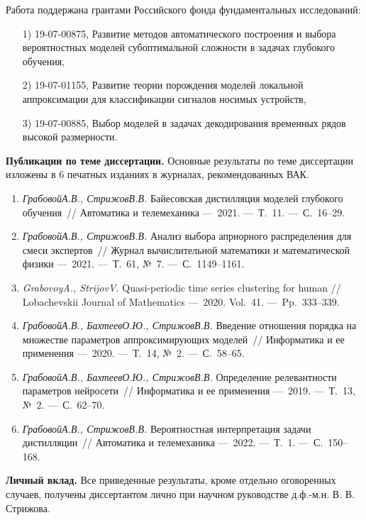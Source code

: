 \documentclass{dissert}
\begin{document}
Работа поддержана грантами Российского фонда фундаментальных исследований:

\begin{enumerate}
    \item[1)] 19-07-00875, Развитие методов автоматического построения и выбора вероятностных моделей субоптимальной сложности в задачах глубокого обучения,
    \item[2)] 19-07-01155, Развитие теории порождения моделей локальной аппроксимации для классификации сигналов носимых устройств,
    \item[3)] 19-07-00885, Выбор моделей в задачах декодирования временных рядов высокой размерности.
\end{enumerate}

\vspace{0.5cm}
\textbf{Публикации по теме диссертации.} Основные результаты по теме диссертации изложены в 6 печатных изданиях в журналах, рекомендованных ВАК.
\begin{enumerate}
    \item \textit{Грабовой\;А.В., Стрижов\;В.В.} Байесовская дистилляция моделей глубокого обучения~// Автоматика и телемеханика ---~2021. ---~Т.~11. ---~С.~16--29.
    \item \textit{Грабовой\;А.В., Стрижов\;В.В.} Анализ выбора априорного распределения для смеси экспертов~// Журнал вычислительной математики и математической физики ---~2021. ---~Т.~61, №~7. ---~С.~1149--1161.
    \item \textit{Grabovoy\;A., Strijov\;V.} Quasi-periodic time series clustering for human // Lobachevskii Journal of Mathematics ---~2020. Vol.~41. ---~Pp.~333--339.
    \item \textit{Грабовой\;А.В., Бахтеев\;О.Ю., Стрижов\;В.В.} Введение отношения порядка на множестве параметров аппроксимирующих моделей~// Информатика и ее применения ---~2020. ---~Т.~14, №~2. ---~С.~58--65.
    \item \textit{Грабовой\;А.В., Бахтеев\;О.Ю., Стрижов\;В.В.} Определение релевантности параметров нейросети~// Информатика и ее применения ---~2019. ---~Т.~13, №~2. ---~С.~62--70.
    \item \textit{Грабовой\;А.В., Стрижов\;В.В.} Вероятностная интерпретация задачи дистилляции~// Автоматика и телемеханика ---~2022. ---~Т.~1. ---~С.~150--168.
\end{enumerate}

\vspace{0.5cm}
\textbf{Личный вклад.} Все приведенные результаты, кроме отдельно оговоренных случаев, получены диссертантом лично при научном руководстве д.ф.-м.н. В. В. Стрижова.
\end{document}
